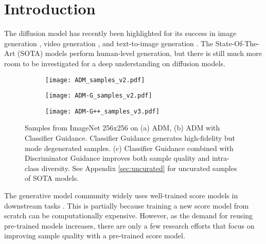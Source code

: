 \documentclass{article}
\theoremstyle{plain}
\theoremstyle{definition}
\theoremstyle{remark}
\begin{document}
\section{Introduction}

The diffusion model has recently been highlighted for its success in image generation \cite{dhariwal2021diffusion, ho2022cascaded, karras2022elucidating, song2020score}, video generation \cite{singer2022make, ho2022video, voleti2022mcvd}, and text-to-image generation \cite{rombach2022high, ramesh2022hierarchical, saharia2022photorealistic}. The State-Of-The-Art (SOTA) models perform human-level generation, but there is still much more room to be investigated for a deep understanding on diffusion models.	

\begin{figure*}[t]
	\centering
	\begin{subfigure}{0.29\linewidth}
		\centering
		\texttt{[image: ADM\_samples\_v2.pdf]}
	\end{subfigure}
	\hfil
	\begin{subfigure}{0.29\linewidth}
		\centering
		\texttt{[image: ADM-G\_samples\_v2.pdf]}
	\end{subfigure}		
	\hfil
	\begin{subfigure}{0.29\linewidth}
		\centering
		\texttt{[image: ADM-G++\_samples\_v3.pdf]}
	\end{subfigure}
	\caption{Samples from ImageNet 256x256 on (a) ADM, (b) ADM with Classifier Guidance. Classifier Guidance generates high-fidelity but mode degenerated samples. (c) Classifier Guidance combined with Discriminator Guidance improves both sample quality and intra-class diversity. See Appendix \ref{sec:uncurated} for uncurated samples of SOTA models.}
	\label{fig:ImageNet256}
	\vskip -0.1in
\end{figure*}

The generative model community widely uses well-trained score models \cite{dhariwal2021diffusion, rombach2022high} in downstream tasks \cite{meng2021sdedit, kawar2022denoising, su2022dual, kim2022unsupervised}. This is partially because training a new score model from scratch can be computationally expensive. However, as the demand for reusing pre-trained models increases, there are only a few research  efforts that focus on improving sample quality with a pre-trained score model.
\end{document}
